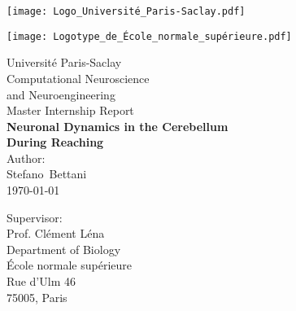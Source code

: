 \begin{titlepage}
	\begin{center}
		\begin{figure*}[h]
			\hbox{}\hfill
			\begin{minipage}[t]{9cm}
				\centering
				\texttt{[image: Logo\_Université\_Paris-Saclay.pdf]}
			\end{minipage}
			\hfill\hbox{}
		\end{figure*}
		\begin{figure*}[h]
			\hbox{}\hfill
			\begin{minipage}[t]{9cm}
				\centering
				\texttt{[image: Logotype\_de\_École\_normale\_supérieure.pdf]}
			\end{minipage}
			\hfill\hbox{}
		\end{figure*}

		{\small Université Paris-Saclay}\\
		{\large Computational Neuroscience\\ and Neuroengineering}\\[10mm]
		{\LARGE Master Internship Report}\\[10mm]
		{\Large\bf Neuronal Dynamics in the Cerebellum \\During Reaching}\\[10mm]
		{\small Author:}\\[1mm]
		{\large Stefano~Bettani}\\[5mm]
		{\small \today}\\[15mm]

		\vspace{3cm}

		\noindent
		\noindent
		\small Supervisor: \\ 
		\large{Prof. Clément Léna} \\
		{\small Department of Biology} \\
		{\small École normale supérieure} \\
		{\small Rue d'Ulm 46} \\
		{\small 75005, Paris}


	
	\restoregeometry
	
\end{center}
\end{titlepage}
